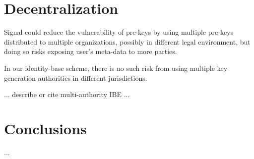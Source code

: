 \documentclass[twoside,letterpaper]{sig-alternate}
\begin{document}
\section{Decentralization}

Signal could reduce the vulnerability of pre-keys by using
multiple pre-keys distributed to multiple organizations,
 possibly in different legal environment, but
doing so risks exposing user's meta-data to more parties.

In our identity-base scheme, there is no such risk from using
multiple key generation authorities in different jurisdictions.

... describe or cite multi-authority IBE ...


\section{Conclusions}

...







\end{document}
